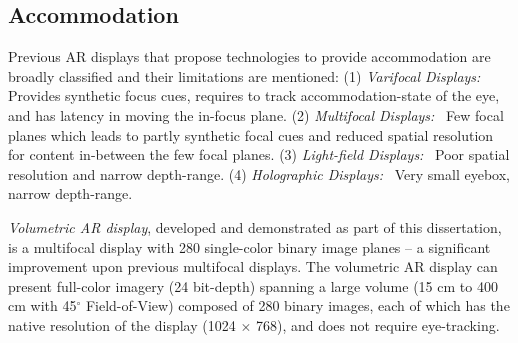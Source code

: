 \subsection{Accommodation}
\label{sec:related_work:accommodation}

Previous AR displays that propose technologies to provide accommodation are broadly classified and their limitations are mentioned: (1) \emph{Varifocal Displays:}~\cite{Dunn2017Wide,Aksit2017Near} Provides synthetic focus cues, requires to track accommodation-state of the eye, and has latency in moving the in-focus plane. (2) \emph{Multifocal Displays:}~\cite{Akeley2004,Narain2015optimal} Few focal planes which leads to partly synthetic focal cues and reduced spatial resolution for content in-between the few focal planes. (3) \emph{Light-field Displays:}~\cite{Maimone2014} Poor spatial resolution and narrow depth-range. (4) \emph{Holographic Displays:}~\cite{Maimone2017Holographic} Very small eyebox, narrow depth-range.

%
\begin{comment}
 \begin{itemize}
 \item \emph{Varifocal Displays:}~\cite{Dunn2017Wide,Aksit2017Near} Provides synthetic focus cues, requires to track accommodation-state of the eye, and has latency in moving the in-focus plane.
 \item \emph{Multifocal Displays:}~\cite{Akeley2004,Narain2015optimal} Few focal planes which leads to partly synthetic focal cues and reduced spatial resolution for content in-between the few focal planes.
 \item \emph{Light-field Displays:}~\cite{Maimone2014} Poor spatial resolution, frame-rates, and narrow depth-range,
 \item \emph{Holographic Displays:}~\cite{Maimone2017Holographic} Very small eyebox, narrow depth-range.
 \end{itemize}
\end{comment}

\emph{Volumetric AR display}, developed and demonstrated as part of this dissertation, is a multifocal display with 280 single-color binary image planes -- a significant improvement upon previous multifocal displays. The volumetric AR display can present full-color imagery (24 bit-depth) spanning a large volume (15 cm to 400 cm with 45$^\circ$ Field-of-View) composed of 280 binary images, each of which has the native resolution of the display (1024 $\times$ 768), and does not require eye-tracking.

